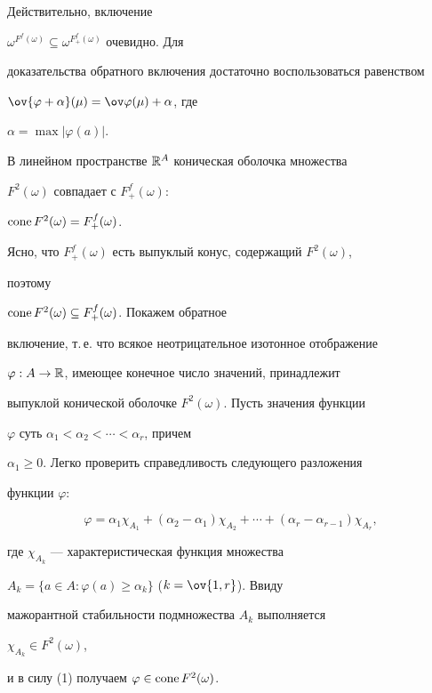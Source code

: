 Действительно, включение 


$\omega^{F^f(\omega)}\subseteq\omega^{F^f_+(\omega)}$ очевидно. Для 


доказательства обратного включения достаточно воспользоваться равенством 


$\ov{\varphi+\alpha}(\mu)=\ov\varphi(\mu)+\alpha$, где 


$\alpha=\max|\varphi(a)|$. 


 


\begin{lem} 


В линейном пространстве $\Bbb R^A$ коническая оболочка множества 


$F^2(\omega)$ совпадает с $F^f_+(\omega):$ 


$\operatorname{cone} F^2(\omega)=F^f_+(\omega)$. 


\end{lem} 


 


\begin{pf} 


Ясно, что $F^f_+(\omega)$ есть выпуклый конус, содержащий $F^2(\omega)$, 


поэтому\linebreak


$\operatorname{cone} F^2(\omega)\subseteq F^f_+(\omega)$. Покажем обратное 


включение, т.\,е. что всякое неотрицательное изотонное отображение 


$\varphi:A\to\Bbb R$, имеющее конечное число значений, принадлежит 


выпуклой конической оболочке $F^2(\omega)$. Пусть значения функции 


$\varphi$ суть $\alpha_1<\alpha_2<\dotsb<\alpha_r$, причем 


$\alpha_1\ge 0$. Легко проверить справедливость следующего разложения 


функции $\varphi$: 


\begin{equation} 


\varphi=\alpha_1\chi_{A_1}+(\alpha_2-\alpha_1)\chi_{A_2}+ 


\dotsb+(\alpha_r-\alpha_{r-1})\chi_{A_r}, 


\end{equation} 


где $\chi_{A_k}$ --- характеристическая функция множества 


$A_k=\{a\in A:\varphi(a)\ge\alpha_k\}$ ($k=\ov{1,r}$). Ввиду 


мажорантной стабильности подмножества $A_k$ выполняется 


$\chi_{A_k}\in F^2(\omega)$, 


и в силу (1) получаем $\varphi\in\operatorname{cone} F^2(\omega)$. 


\end{pf} 


